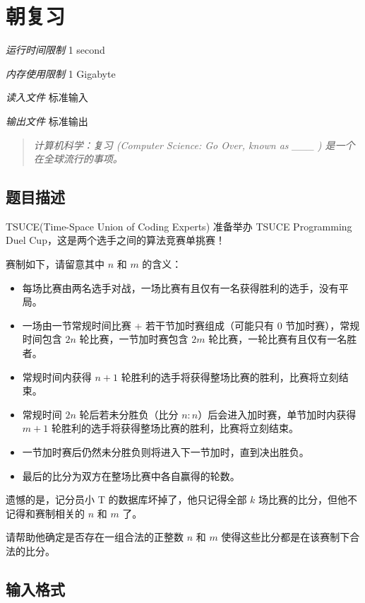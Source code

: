 \section[G. 朝复习]{ 朝复习}

\textit{运行时间限制}   1 second

\textit{内存使用限制} 1 Gigabyte

\textit{读入文件} \qquad 标准输入

\textit{输出文件} \qquad 标准输出


\begin{quote}
	\textit{计算机科学：复习 (Computer Science: Go Over, known as \_\_\_ ) 是一个在全球流行的事项。}
\end{quote}


\subsection{题目描述}

TSUCE(Time-Space Union of Coding Experts) 准备举办 TSUCE Programming Duel Cup，这是两个选手之间的算法竞赛单挑赛！

赛制如下，请留意其中 $n$ 和 $m$ 的含义：
\begin{itemize}
	\item 每场比赛由两名选手对战，一场比赛有且仅有一名获得胜利的选手，没有平局。
	\item 一场由一节常规时间比赛 + 若干节加时赛组成（可能只有 $0$ 节加时赛），常规时间包含 $2n$ 轮比赛，一节加时赛包含 $2m$ 轮比赛，一轮比赛有且仅有一名胜者。
	\item 常规时间内获得 $n + 1$ 轮胜利的选手将获得整场比赛的胜利，比赛将立刻结束。
	\item 常规时间 $2n$ 轮后若未分胜负（比分 $n:n$）后会进入加时赛，单节加时内获得 $m + 1$ 轮胜利的选手将获得整场比赛的胜利，比赛将立刻结束。
	\item 一节加时赛后仍然未分胜负则将进入下一节加时，直到决出胜负。
	\item 最后的比分为双方在整场比赛中各自赢得的轮数。
\end{itemize}

遗憾的是，记分员小 T 的数据库坏掉了，他只记得全部 $k$ 场比赛的比分，但他不记得和赛制相关的 $n$ 和 $m$ 了。

请帮助他确定是否存在一组合法的正整数 $n$ 和 $m$ 使得这些比分都是在该赛制下合法的比分。

\subsection{输入格式}

